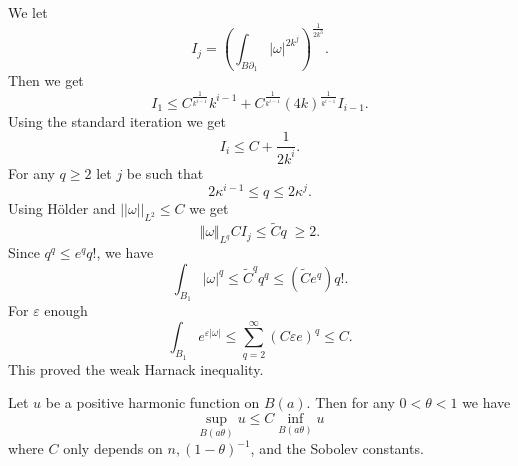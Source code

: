 %
We let 
%
\[ I_j = \left( \int _{B\partial _{1}} |\omega |^{2 k ^{j}} \right) ^{\frac{1}{2k^{3}}}.\]
%
Then we get 
%
\[ I_1 \leq C ^{\frac{1}{k^{i-1}}}  k ^{i-1} + C ^{\frac{1}{k^{i-1}}}  (4 k)  ^{\frac{1}{k^{i-1}}}I_{i-1}.\]
Using the standard iteration we get 
%
\[ I_i \leq C + \frac{1}{2k ^i} .\]
%
For any $ q \geq 2  $ let $j$ be such that 
%
\[ 2 \kappa ^{i-1} \leq q \leq 2\kappa^{ j}.\]
%
Using H\"{o}lder and $ || \omega ||_{L^{2}} \leq C $ we get 
%
\[\Vert \omega \Vert_{L^{q}} C I_j \leq \tilde{C} q \; \geq 2.\]
%
Since $ q ^q \leq e^q q !$, we have 
%
\[\int_{B_{1}} |\omega | ^q \leq \tilde{C} ^q q ^q \leq ( \tilde{C} e ^q) q !.\]
%
For $ \varepsilon$ enough
%
\[\int_{B_{1}} e ^{\varepsilon |\omega|} \leq \sum^\infty_{q = 2} (C \varepsilon e )^q \leq C .\]
%
This proved the weak Harnack inequality.

\begin{theorem}  Let $u$ be a positive harmonic function on $ B(a)$. Then for any $ 0 < \theta < 1 $ we have 
%
\[\sup _{B(a\theta)} u \leq C \inf_{B(a \theta) }u \]
%
where $C$ only depends on $n, (1 - \theta )^{-1} $, and the Sobolev constants.
\end{theorem}

